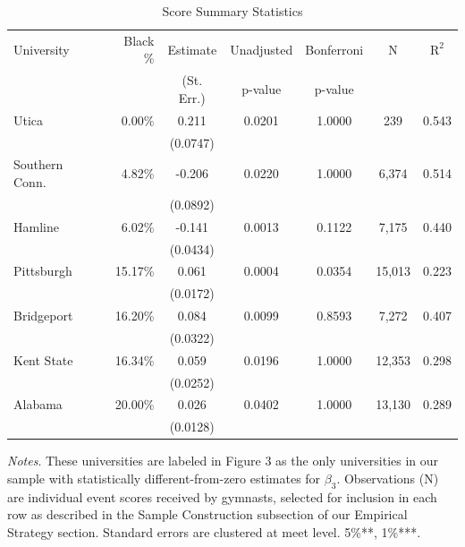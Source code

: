 \documentclass[12pt]{article}
\begin{document}
\begin{table}[htbp]
    \centering
    \begin{threeparttable}
    
        \caption{Score Summary Statistics}
        
        \begin{tabular}{lrccccc}
    \toprule
    University & Black \% & Estimate & Unadjusted & Bonferroni & N & $\text{R}^2$ \\
               & & \small(St. Err.) & p-value & p-value & & \\
    \midrule
    Utica           & 0.00\% & 0.211 & 0.0201 & 1.0000 & 239 & 0.543 \\
                    & & \small(0.0747) & & & & \\
    Southern Conn.  & 4.82\% & -0.206 & 0.0220 & 1.0000 & 6,374 & 0.514 \\
                    & & \small(0.0892) & & & & \\
    Hamline         & 6.02\% & -0.141 & 0.0013 & 0.1122 & 7,175 & 0.440 \\
                    & & \small(0.0434) & & & & \\
    Pittsburgh      & 15.17\% & 0.061 & 0.0004 & 0.0354 & 15,013 & 0.223 \\
                    & & \small(0.0172) & & & & \\
    Bridgeport      & 16.20\% & 0.084 & 0.0099 & 0.8593 & 7,272 & 0.407 \\
                    & & \small(0.0322) & & & & \\
    Kent State      & 16.34\% & 0.059 & 0.0196 & 1.0000 & 12,353 & 0.298 \\
                    & & \small(0.0252) & & & & \\
    Alabama         & 20.00\% & 0.026 & 0.0402 & 1.0000 & 13,130 & 0.289 \\
                    & & \small(0.0128) & & & & \\
    \bottomrule
\end{tabular}

        \begin{tablenotes}[flushleft] %
            \small
            \item \textit{Notes}. These universities are labeled in Figure 3 as the only universities in our sample with statistically different-from-zero estimates for $\beta_3$. Observations (N) are individual event scores received by gymnasts, selected for inclusion in each row as described in the Sample Construction subsection of our Empirical Strategy section. Standard errors are clustered at meet level. 5\%**, 1\%***.
        \end{tablenotes}
        
    \end{threeparttable}
\end{table}
\end{document}
